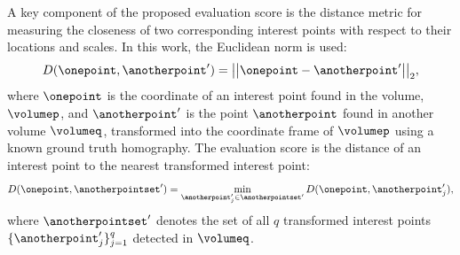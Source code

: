 A key component of the proposed evaluation score is the distance metric for measuring the closeness of two corresponding interest points with respect to their locations and scales. In this work, the Euclidean norm is used:
\begin{equation}
	D(\onepoint, \anotherpoint') = \big|\big|\onepoint - \anotherpoint'\big|\big|_{2},
	\label{eqn/eval/matchdistance}
\end{equation}
where $\onepoint$ is the coordinate of an interest point found in the volume, $\volumep$, and $\anotherpoint'$ is the point $\anotherpoint$ found in another volume $\volumeq$, transformed into the coordinate frame of $\volumep$ using a known ground truth homography. The evaluation score is the distance of an interest point to the nearest transformed interest point:
\begin{equation}
D(\onepoint, \anotherpointset') = \min_{\anotherpoint'_j \in \anotherpointset'}D(\onepoint, \anotherpoint'_j),
\label{eqn/eval/metricNN}
\end{equation}
where $\anotherpointset'$ denotes the set of all $q$ transformed interest points $\{\anotherpoint'_j\}_{j=1}^{q}$ detected in $\volumeq$.

